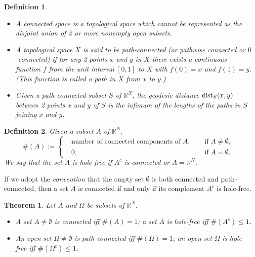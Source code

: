 \documentclass{book}
\numberwithin{equation}{section}
\newtheorem{definition}{Definition}[section]
\newtheorem{theorem}{Theorem}[section]
\begin{document}
\begin{definition}
    \begin{itemize}
        \item[(i)] A \emph{connected space} is a topological space which cannot be represented as the disjoint union of 2 or more nonempty open subsets.
        \item[(ii)] A topological space $X$ is said to be \emph{path-connected} (or \emph{pathwise connected} or \textit{$0$-connected}) if for any 2 points $x$ and $y$ in $X$ there exists a continuous function $f$ from the unit interval $[0,1]$ to $X$ with $f(0) = x$ and $f(1) = y$. (This function is called a \emph{path} in $X$ from $x$ to $y$.)
        \item[(iii)] Given a path-connected subset $S$ of $\mathbb{R}^N$, the \emph{geodesic distance} ${\rm dist}_S(x,y)$ between 2 points $x$ and $y$ of $S$ is the infimum of the lengths of the paths in $S$ joining $x$ and $y$.
    \end{itemize}
\end{definition}

\begin{definition}
    Given a subset $A$ of $\mathbb{R}^N$,
    \begin{equation*}
        \#(A) := \left\{\begin{split}
            &\mbox{number of connected components of } A, &&\mbox{ if } A\ne\emptyset,\\
            &0, &&\mbox{ if } A = \emptyset.
        \end{split}\right.
    \end{equation*}
    We say that the set $A$ is \emph{hole-free} if $A^c$ is connected or $A = \mathbb{R}^N$.
\end{definition}
If we adopt the \textit{convention} that the empty set $\emptyset$ is both connected and path-connected, then a set $A$ is connected if and only if its complement $A^c$ is hole-free.

\begin{theorem}
    Let $A$ and $\Omega$ be subsets of $\mathbb{R}^N$.
    \begin{itemize}
        \item[(i)] A set $A\ne\emptyset$ is connected iff $\#(A) = 1$; a set $A$ is hole-free iff $\#\left(A^c\right)\le 1$.
        \item[(ii)] An open set $\Omega\ne\emptyset$ is path-connected iff $\#(\Omega) = 1$; an open set $\Omega$ is hole-free iff $\#\left(\Omega^c\right)\le 1$.
    \end{itemize}
\end{theorem}
\end{document}
